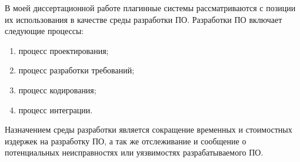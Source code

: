 
В моей диссертационной работе плагинные системы рассматриваются с позиции их использования в качестве среды разработки ПО. Разработки ПО включает следующие процессы:
\begin{enumerate}
    \item процесс проектирования;
    \item процесс разработки требований;
    \item процесс кодирования;
    \item процесс интеграции.
\end{enumerate}

Назначением среды разработки является сокращение временных и стоимостных издержек на разработку ПО, а так же отслеживание и сообщение о потенциальных неисправностях или уязвимостях разрабатываемого ПО.